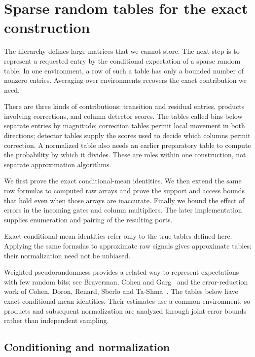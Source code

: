 \section{Sparse random tables for the exact construction}
\label{sec:atom}

The hierarchy defines large matrices that we cannot store. The next step is to represent a requested entry by the conditional expectation of a sparse random table. In one environment, a row of such a table has only a bounded number of nonzero entries. Averaging over environments recovers the exact contribution we need.

There are three kinds of contributions: transition and residual entries, products involving corrections, and column detector scores. The tables called bins below separate entries by magnitude; correction tables permit local movement in both directions; detector tables supply the scores used to decide which columns permit correction. A normalized table also needs an earlier preparatory table to compute the probability by which it divides. These are roles within one construction, not separate approximation algorithms.

We first prove the exact conditional-mean identities.  We then extend the
same row formulas to computed raw arrays and prove the support and access
bounds that hold even when those arrays are inaccurate.  Finally we bound
the effect of errors in the incoming gates and column multipliers.  The
later implementation supplies enumeration and pairing of the resulting
ports.

Exact conditional-mean identities refer only to the true tables defined
here.  Applying the same formulas to approximate raw signals gives
approximate tables; their normalization need not be unbiased.

Weighted pseudorandomness provides a related way to represent expectations
with few random bits; see Braverman, Cohen and Garg~\cite{BravermanCohenGarg2020}
and the error-reduction work of Cohen, Doron, Renard, Sberlo and
Ta-Shma~\cite{CohenDoronRenardSberloTaShma2021}. The tables below have
exact conditional-mean identities. Their estimates use a common
environment, so products and subsequent normalization are analyzed
through joint error bounds rather than independent sampling.

\subsection{Conditioning and normalization}

